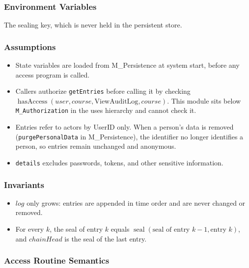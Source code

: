\documentclass[12pt, titlepage]{article}
\begin{document}
\subsubsection{Environment Variables}

The sealing key, which is never held in the persistent store.

\subsubsection{Assumptions}

\begin{itemize}
    \item State variables are loaded from M\_Persistence at system start, before any access program is called.
    \item Callers authorize \texttt{getEntries} before calling it by checking $\operatorname{hasAccess}(user,course,\text{ViewAuditLog},course)$.
    This module sits below \texttt{M\_Authorization} in the uses hierarchy and cannot check it.
    \item Entries refer to actors by UserID only. When a person's data is removed (\texttt{purgePersonalData} in M\_Persistence),
    the identifier no longer identifies a person, so entries remain unchanged and anonymous.
    \item \texttt{details} excludes passwords, tokens, and other sensitive information.
\end{itemize}

\subsubsection{Invariants}

\begin{itemize}
    \item $\mathit{log}$ only grows: entries are appended in time order and are never changed or removed.
    \item For every $k$, the seal of entry $k$ equals $\operatorname{seal}(\text{seal of entry }k{-}1,\text{entry }k)$,
    and $\mathit{chainHead}$ is the seal of the last entry.
\end{itemize}

\subsubsection{Access Routine Semantics}
\end{document}
